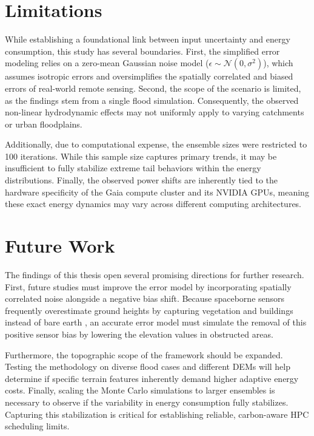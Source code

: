 \section{Limitations}
\label{sec:limitations}

While establishing a foundational link between input uncertainty and energy consumption, this study has several boundaries. First, the simplified error modeling relies on a zero-mean Gaussian noise model ($\epsilon \sim \mathcal{N}(0, \sigma^2)$), which assumes isotropic errors and oversimplifies the spatially correlated and biased errors of real-world remote sensing. Second, the scope of the scenario is limited, as the findings stem from a single flood simulation. Consequently, the observed non-linear hydrodynamic effects may not uniformly apply to varying catchments or urban floodplains.

Additionally, due to computational expense, the ensemble sizes were restricted to 100 iterations. While this sample size captures primary trends, it may be insufficient to fully stabilize extreme tail behaviors within the energy distributions. Finally, the observed power shifts are inherently tied to the hardware specificity of the Gaia compute cluster and its NVIDIA GPUs, meaning these exact energy dynamics may vary across different computing architectures.

\section{Future Work}
\label{sec:future-work}

The findings of this thesis open several promising directions for further research. First, future studies must improve the error model by incorporating spatially correlated noise alongside a negative bias shift. Because spaceborne sensors frequently overestimate ground heights by capturing vegetation and buildings instead of bare earth \cite{Meadows2024}, an accurate error model must simulate the removal of this positive sensor bias by lowering the elevation values in obstructed areas.

Furthermore, the topographic scope of the framework should be expanded. Testing the methodology on diverse flood cases and different DEMs will help determine if specific terrain features inherently demand higher adaptive energy costs. Finally, scaling the Monte Carlo simulations to larger ensembles is necessary to observe if the variability in energy consumption fully stabilizes. Capturing this stabilization is critical for establishing reliable, carbon-aware HPC scheduling limits.